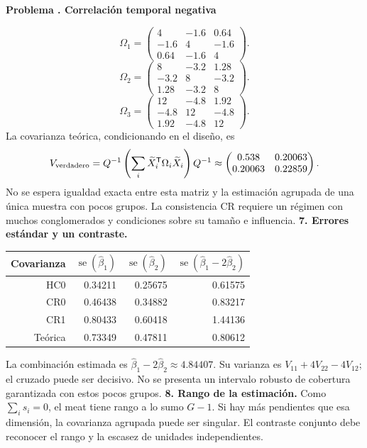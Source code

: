 \documentclass[11pt,a4paper]{article}
\newcommand{\T}{^{\mathsf T}}
\theoremstyle{definition}
\newcounter{problema}
\newenvironment{resuelto}[1]{\refstepcounter{problema}\par\medskip\Needspace{6\baselineskip}\textbf{Problema \theproblema. #1}\par}{\par\medskip}
\DeclareMathOperator{\se}{se}
\begin{document}
\begin{resuelto}{Correlación temporal negativa}
\[
\Omega_{1}=\begin{pmatrix}
4&-1.6&0.64\\-1.6&4&-1.6\\0.64&-1.6&4
\end{pmatrix}.
\]
\[
\Omega_{2}=\begin{pmatrix}
8&-3.2&1.28\\-3.2&8&-3.2\\1.28&-3.2&8
\end{pmatrix}.
\]
\[
\Omega_{3}=\begin{pmatrix}
12&-4.8&1.92\\-4.8&12&-4.8\\1.92&-4.8&12
\end{pmatrix}.
\]
La covarianza teórica, condicionando en el diseño, es
\[
V_{\rm verdadero}=Q^{-1}\left(\sum_i\widetilde X_i\T\Omega_i\widetilde X_i\right)Q^{-1}\approx\begin{pmatrix}
0.538&0.20063\\0.20063&0.22859
\end{pmatrix}.
\]
No se espera igualdad exacta entre esta matriz y la estimación agrupada de una única muestra con pocos grupos. La consistencia CR requiere un régimen con muchos conglomerados y condiciones sobre su tamaño e influencia.
\textbf{7. Errores estándar y un contraste.}

\begin{center}\small
\begin{tabular}{rrrr}
\toprule
Covarianza&$\se(\widehat\beta_1)$&$\se(\widehat\beta_2)$&$\se(\widehat\beta_1-2\widehat\beta_2)$\\
\midrule
HC0&0.34211&0.25675&0.61575\\
CR0&0.46438&0.34882&0.83217\\
CR1&0.80433&0.60418&1.44136\\
Teórica&0.73349&0.47811&0.80612\\
\bottomrule
\end{tabular}
\end{center}
La combinación estimada es $\widehat\beta_1-2\widehat\beta_2\approx4.84407$. Su varianza es $V_{11}+4V_{22}-4V_{12}$; el cruzado puede ser decisivo. No se presenta un intervalo robusto de cobertura garantizada con estos pocos grupos.
\textbf{8. Rango de la estimación.} Como $\sum_i s_i=0$, el meat tiene rango a lo sumo $G-1$. Si hay más pendientes que esa dimensión, la covarianza agrupada puede ser singular. El contraste conjunto debe reconocer el rango y la escasez de unidades independientes.
\end{resuelto}
\end{document}
